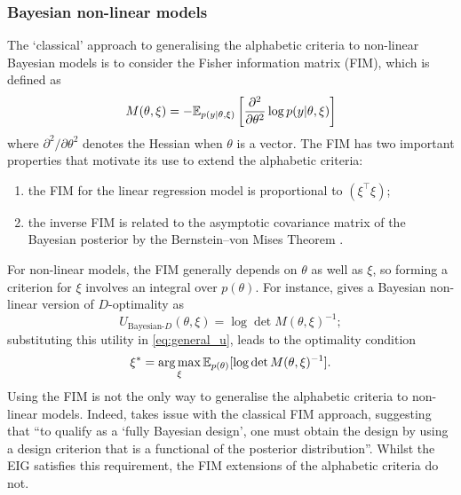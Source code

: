 \documentclass[a4paper, 10pt]{report}
\theoremstyle{plain}
\begin{document}
	\subsubsection{Bayesian non-linear models}
	The `classical' approach \citep{tsutakawa1972design,chaloner1995} to generalising the alphabetic criteria to non-linear Bayesian models is to consider the Fisher information matrix (FIM), which is defined as
	\begin{equation}
	\label{eq:fim}
	M(\theta,\xi) = -\mathbb{E}_{p(y|\theta,\xi)}\left[ \frac{\partial^2}{\partial \theta^2} \log p(y|\theta,\xi)  \right]
	\end{equation}
	where $\partial^2/\partial \theta^2$ denotes the Hessian when $\theta$ is a vector. 
	The FIM has two important properties that motivate its use to extend the alphabetic criteria:
	\begin{enumerate}
		\item the FIM for the linear regression model is proportional to $(\xi^\top \xi)$;
		\item the inverse FIM is related to the asymptotic covariance matrix of the Bayesian posterior by the Bernstein--von Mises Theorem \citep{van2000asymptotic}.
	\end{enumerate}
	For non-linear models, the FIM generally depends on $\theta$ as well as $\xi$, so forming a criterion for $\xi$ involves an integral over $p(\theta)$.
	For instance, \citet{chaloner1995} gives a Bayesian non-linear version of $D$-optimality as
	\begin{equation}
	U_{\text{Bayesian-}D}(\theta,\xi) = \log\det M(\theta,\xi)^{-1};
	\end{equation}
	substituting this utility in \eqref{eq:general_u}, leads to the optimality condition
	\begin{equation}
	\xi^* = \operatorname*{arg\,max}_\xi \mathbb{E}_{p(\theta)}[\log\det M(\theta,\xi)^{-1}].
	\end{equation}
	Using the FIM is not the only way to generalise the alphabetic criteria to non-linear models.
	Indeed, \citet{ryan2016review} takes issue with the classical FIM approach, suggesting that ``to qualify as a `fully Bayesian design', one must obtain the design by using a design criterion that is a functional of the posterior distribution''. Whilst the EIG satisfies this requirement, the FIM extensions of the alphabetic criteria do not.
	
\end{document}
